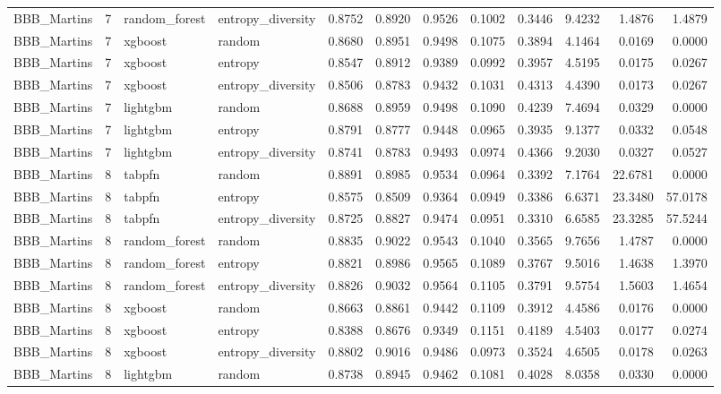 \begin{tabular}{lrllrrrrrrrr}
BBB_Martins & 7 & random_forest & entropy_diversity & 0.8752 & 0.8920 & 0.9526 & 0.1002 & 0.3446 & 9.4232 & 1.4876 & 1.4879 \\
BBB_Martins & 7 & xgboost & random & 0.8680 & 0.8951 & 0.9498 & 0.1075 & 0.3894 & 4.1464 & 0.0169 & 0.0000 \\
BBB_Martins & 7 & xgboost & entropy & 0.8547 & 0.8912 & 0.9389 & 0.0992 & 0.3957 & 4.5195 & 0.0175 & 0.0267 \\
BBB_Martins & 7 & xgboost & entropy_diversity & 0.8506 & 0.8783 & 0.9432 & 0.1031 & 0.4313 & 4.4390 & 0.0173 & 0.0267 \\
BBB_Martins & 7 & lightgbm & random & 0.8688 & 0.8959 & 0.9498 & 0.1090 & 0.4239 & 7.4694 & 0.0329 & 0.0000 \\
BBB_Martins & 7 & lightgbm & entropy & 0.8791 & 0.8777 & 0.9448 & 0.0965 & 0.3935 & 9.1377 & 0.0332 & 0.0548 \\
BBB_Martins & 7 & lightgbm & entropy_diversity & 0.8741 & 0.8783 & 0.9493 & 0.0974 & 0.4366 & 9.2030 & 0.0327 & 0.0527 \\
BBB_Martins & 8 & tabpfn & random & 0.8891 & 0.8985 & 0.9534 & 0.0964 & 0.3392 & 7.1764 & 22.6781 & 0.0000 \\
BBB_Martins & 8 & tabpfn & entropy & 0.8575 & 0.8509 & 0.9364 & 0.0949 & 0.3386 & 6.6371 & 23.3480 & 57.0178 \\
BBB_Martins & 8 & tabpfn & entropy_diversity & 0.8725 & 0.8827 & 0.9474 & 0.0951 & 0.3310 & 6.6585 & 23.3285 & 57.5244 \\
BBB_Martins & 8 & random_forest & random & 0.8835 & 0.9022 & 0.9543 & 0.1040 & 0.3565 & 9.7656 & 1.4787 & 0.0000 \\
BBB_Martins & 8 & random_forest & entropy & 0.8821 & 0.8986 & 0.9565 & 0.1089 & 0.3767 & 9.5016 & 1.4638 & 1.3970 \\
BBB_Martins & 8 & random_forest & entropy_diversity & 0.8826 & 0.9032 & 0.9564 & 0.1105 & 0.3791 & 9.5754 & 1.5603 & 1.4654 \\
BBB_Martins & 8 & xgboost & random & 0.8663 & 0.8861 & 0.9442 & 0.1109 & 0.3912 & 4.4586 & 0.0176 & 0.0000 \\
BBB_Martins & 8 & xgboost & entropy & 0.8388 & 0.8676 & 0.9349 & 0.1151 & 0.4189 & 4.5403 & 0.0177 & 0.0274 \\
BBB_Martins & 8 & xgboost & entropy_diversity & 0.8802 & 0.9016 & 0.9486 & 0.0973 & 0.3524 & 4.6505 & 0.0178 & 0.0263 \\
BBB_Martins & 8 & lightgbm & random & 0.8738 & 0.8945 & 0.9462 & 0.1081 & 0.4028 & 8.0358 & 0.0330 & 0.0000 \\

\end{tabular}
